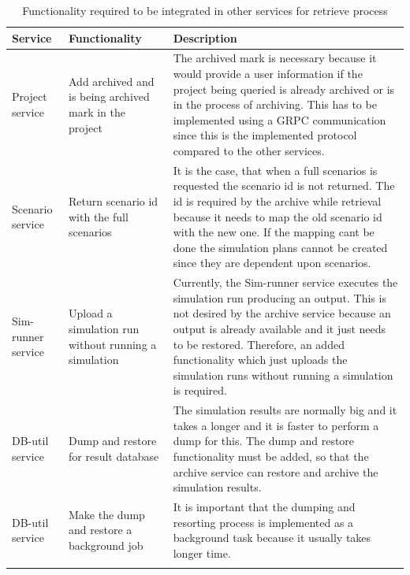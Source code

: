     \begin{longtable}{|p{2cm}|p{6cm}|p{7cm}|}
        \hline
            \textbf{Service}  & \textbf{Functionality} & \textbf{Description}\\
        \hline
            Project service & Add archived and is being archived mark in the project &  The archived mark is necessary because
            it would provide a user information if the project being queried is already archived or is in the process of archiving. This has to be
            implemented using a GRPC communication since this is the implemented protocol compared to the other services.  \\
        \hline
            Scenario service & Return scenario id with the full scenarios & It is the case, that when a full scenarios is requested the scenario id is
            not returned. The id is required by the archive while retrieval because it needs to map the old scenario id with the new one. If the mapping
            cant be done the simulation plans cannot be created since they are dependent upon scenarios.\\
        \hline
            Sim-runner service & Upload a simulation run without running a simulation & Currently, the Sim-runner service executes the simulation run producing an
            output. This is not desired by the archive service because an output is already available and it just needs to be restored. Therefore, an added 
            functionality which just uploads the simulation runs without running a simulation is required.\\
        \hline
            DB-util service & Dump and restore for result database & The simulation results are normally big and it takes a longer and it is faster to
            perform a dump for this. The dump and restore functionality must be added, so that the archive service can restore and archive the simulation results.\\
        \hline
            DB-util service & Make the dump and restore a background job & It is important that the dumping and resorting process is implemented as a background task
            because it usually takes longer time.\\

        \hline
        \caption{Functionality required to be integrated in other services for retrieve process}
        \label{table:funcRestore} 
    \end{longtable}

